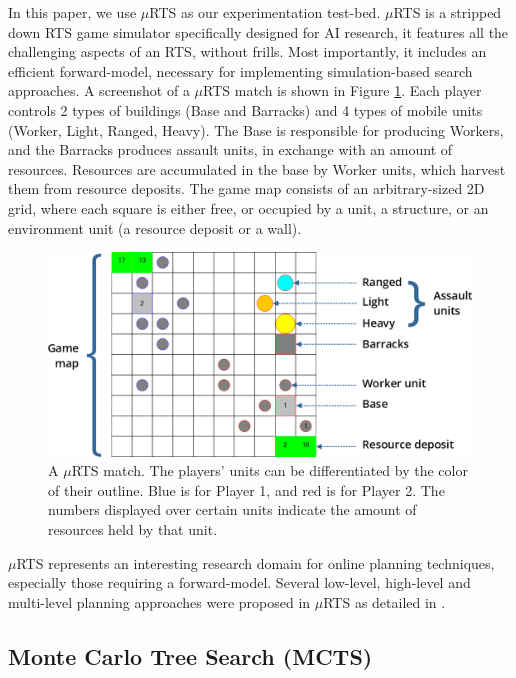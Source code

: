 \documentclass[conference]{IEEEtran}
\newcommand{\mRTS}{$\mu$RTS}
\begin{document}
In this paper, we use \mRTS{} as our experimentation test-bed. \mRTS{} is a stripped down RTS game simulator specifically designed for AI research, it features all the challenging aspects of an RTS, without frills. Most importantly, it includes an efficient forward-model, necessary for implementing simulation-based search approaches. A screenshot of a \mRTS{} match is shown in Figure \ref{mRTSScreenshot}. Each player controls 2 types of buildings (Base and Barracks) and 4 types of mobile units (Worker, Light, Ranged, Heavy). The Base is responsible for producing Workers, and the Barracks produces assault units, in exchange with an amount of resources. Resources are accumulated in the base by Worker units, which harvest them from resource deposits. The game map consists of an arbitrary-sized 2D grid, where each square is either free, or occupied by a unit, a structure, or an environment unit (a resource deposit or a wall).

\begin{figure}[t]
\begin{center}
	\includegraphics[scale=1]{figs/mRTS.png}
	\caption{A \mRTS{} match. The players' units can be differentiated by the color of their outline. Blue is for Player 1, and red is for Player 2. The numbers displayed over certain units indicate the amount of resources held by that unit. }
	\label{mRTSScreenshot}
\end{center}
\end{figure}

\mRTS{} represents an interesting research domain for online planning techniques, especially those requiring a forward-model. Several low-level, high-level and multi-level planning approaches were proposed in \mRTS{} as detailed in \cite{ouessai_online_2019}.


\subsection{Monte Carlo Tree Search (MCTS)}
\end{document}
